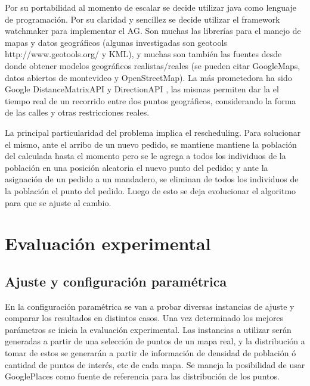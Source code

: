 \documentclass[9pt,conference]{IEEEtran}
\begin{document}
		
		Por su portabilidad al momento de escalar se decide utilizar java como lenguaje de programación.
		Por su claridad y sencillez se decide utilizar el framework watchmaker para implementar el AG.
		Son muchas las librerías para el manejo de mapas y datos geográficos (algunas investigadas son geotools http://www.geotools.org/ y KML), y muchas son también las fuentes desde donde obtener modelos geográficos realistas/reales (se pueden citar GoogleMaps, datos abiertos de montevideo y OpenStreetMap). La más prometedora ha sido Google DistanceMatrixAPI \cite{refgapimatrix} y DirectionAPI \cite{refgapidirs}, las mismas permiten dar la el tiempo real de un recorrido entre dos puntos geográficos, considerando la forma de las calles y otras restricciones reales.

		La principal particularidad del problema implica el rescheduling. Para solucionar el mismo, ante el arribo de un nuevo pedido, se mantiene mantiene la población del calculada hasta el momento pero se le agrega a todos los individuos de la población en una posición aleatoria el nuevo punto del pedido; y ante la asignación de un pedido a un mandadero, se eliminan de todos los individuos de la población el punto del pedido. Luego de esto se deja evolucionar el algoritmo para que se ajuste al cambio.


	\section{Evaluación experimental}

	\subsection{Ajuste y configuración paramétrica}

		En la configuración paramétrica se van a probar diversas instancias de ajuste y comparar los resultados en distintos casos. Una vez determinado los mejores parámetros se inicia la evaluación experimental.
		Las instancias a utilizar serán generadas a partir de una selección de puntos de un mapa real, y la distribución a tomar de estos se generarán a partir de información de densidad de población ó cantidad de puntos de interés, etc de cada mapa. Se maneja la posibilidad de usar GooglePlaces como fuente de referencia para las distribución de los puntos.
		
\end{document}
